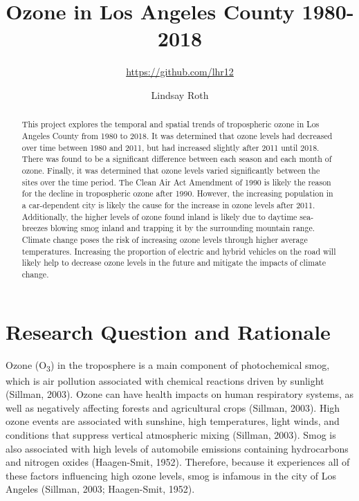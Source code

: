 \documentclass[12pt,]{article}
\title{Ozone in Los Angeles County 1980-2018}
\subtitle{\url{https://github.com/lhr12}}
\author{Lindsay Roth}
\date{}
\begin{document}
\maketitle
\begin{abstract}
This project explores the temporal and spatial trends of tropospheric
ozone in Los Angeles County from 1980 to 2018. It was determined that
ozone levels had decreased over time between 1980 and 2011, but had
increased slightly after 2011 until 2018. There was found to be a
significant difference between each season and each month of ozone.
Finally, it was determined that ozone levels varied significantly
between the sites over the time period. The Clean Air Act Amendment of
1990 is likely the reason for the decline in tropospheric ozone after
1990. However, the increasing population in a car-dependent city is
likely the cause for the increase in ozone levels after 2011.
Additionally, the higher levels of ozone found inland is likely due to
daytime sea-breezes blowing smog inland and trapping it by the
surrounding mountain range. Climate change poses the risk of increasing
ozone levels through higher average temperatures. Increasing the
proportion of electric and hybrid vehicles on the road will likely help
to decrease ozone levels in the future and mitigate the impacts of
climate change.
\end{abstract}

\newpage

\tableofcontents  \newpage
\listoftables  \newpage
\listoffigures  \newpage

\section{Research Question and
Rationale}\label{research-question-and-rationale}

Ozone (O\textsubscript{3}) in the troposphere is a main component of
photochemical smog, which is air pollution associated with chemical
reactions driven by sunlight (Sillman, 2003). Ozone can have health
impacts on human respiratory systems, as well as negatively affecting
forests and agricultural crops (Sillman, 2003). High ozone events are
associated with sunshine, high temperatures, light winds, and conditions
that suppress vertical atmospheric mixing (Sillman, 2003). Smog is also
associated with high levels of automobile emissions containing
hydrocarbons and nitrogen oxides (Haagen-Smit, 1952). Therefore, because
it experiences all of these factors influencing high ozone levels, smog
is infamous in the city of Los Angeles (Sillman, 2003; Haagen-Smit,
1952).
\end{document}
